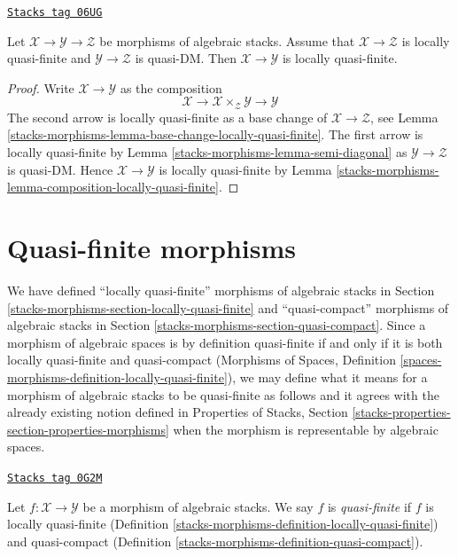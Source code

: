 \begin{lemma}
\label{stacks-morphisms-lemma-locally-quasi-finite-permanence}
\href{https://stacks.math.columbia.edu/tag/06UG}{\texttt{Stacks tag 06UG}}

Let $\mathcal{X} \to \mathcal{Y} \to \mathcal{Z}$ be morphisms
of algebraic stacks. Assume that $\mathcal{X} \to \mathcal{Z}$
is locally quasi-finite and $\mathcal{Y} \to \mathcal{Z}$ is quasi-DM.
Then $\mathcal{X} \to \mathcal{Y}$ is locally quasi-finite.
\end{lemma}

\begin{proof}
Write $\mathcal{X} \to \mathcal{Y}$ as the composition
$$
\mathcal{X} \longrightarrow
\mathcal{X} \times_\mathcal{Z} \mathcal{Y} \longrightarrow
\mathcal{Y}
$$
The second arrow is locally quasi-finite as a base change of
$\mathcal{X} \to \mathcal{Z}$, see
Lemma \ref{stacks-morphisms-lemma-base-change-locally-quasi-finite}.
The first arrow is locally quasi-finite by
Lemma \ref{stacks-morphisms-lemma-semi-diagonal}
as $\mathcal{Y} \to \mathcal{Z}$ is quasi-DM.
Hence $\mathcal{X} \to \mathcal{Y}$ is locally quasi-finite by
Lemma \ref{stacks-morphisms-lemma-composition-locally-quasi-finite}.
\end{proof}

\section{Quasi-finite morphisms}
\label{stacks-morphisms-section-quasi-finite}
We have defined ``locally quasi-finite'' morphisms of algebraic stacks
in Section \ref{stacks-morphisms-section-locally-quasi-finite} and ``quasi-compact'' morphisms
of algebraic stacks in Section \ref{stacks-morphisms-section-quasi-compact}. Since a morphism
of algebraic spaces is by definition quasi-finite if and only if it is both
locally quasi-finite and quasi-compact (Morphisms of Spaces, Definition
\ref{spaces-morphisms-definition-locally-quasi-finite}),
we may define what it means for a morphism of algebraic stacks to be
quasi-finite as follows and it agrees with the already existing notion defined
in Properties of Stacks,
Section \ref{stacks-properties-section-properties-morphisms}
when the morphism is representable by algebraic spaces.

\begin{definition}
\label{stacks-morphisms-definition-quasi-finite}
\href{https://stacks.math.columbia.edu/tag/0G2M}{\texttt{Stacks tag 0G2M}}

\begin{reference}
\cite{rydh_approx}
\end{reference}
Let $f : \mathcal{X} \to \mathcal{Y}$ be a morphism of algebraic stacks.
We say $f$ is {\it quasi-finite} if $f$ is locally quasi-finite
(Definition \ref{stacks-morphisms-definition-locally-quasi-finite})
and quasi-compact (Definition \ref{stacks-morphisms-definition-quasi-compact}).
\end{definition}

